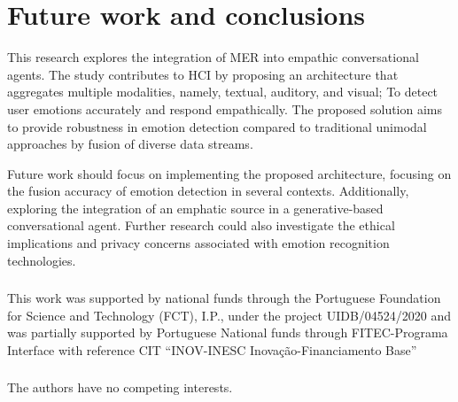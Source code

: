 \documentclass[runningheads]{llncs}
\begin{document}




\section{Future work and conclusions}
\label{sec:conclusions}
This research explores the integration of MER into empathic conversational agents. The study contributes to HCI by proposing an architecture that aggregates multiple modalities, namely, textual, auditory, and visual; To detect user emotions accurately and respond empathically. The proposed solution aims to provide robustness in emotion detection compared to traditional unimodal approaches by fusion of diverse data streams.

Future work should focus on implementing the proposed architecture, focusing on the fusion accuracy of emotion detection in several contexts. Additionally, exploring the integration of an emphatic source in a generative-based conversational agent. Further research could also investigate the ethical implications and privacy concerns associated with emotion recognition technologies.

\begin{credits}
\subsubsection{\ackname} This work was supported by national funds through the Portuguese Foundation for Science and Technology (FCT), I.P., under the project UIDB/04524/2020 and was partially supported by Portuguese National funds through FITEC-Programa Interface with reference CIT “INOV-INESC Inovação-Financiamento Base”

\subsubsection{\discintname}
The authors have no competing interests.
\end{credits}
%
%
%


%
\end{document}
